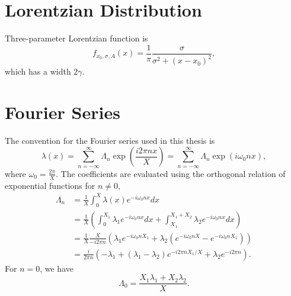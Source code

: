 \section{Lorentzian Distribution}


Three-parameter Lorentzian function is
\begin{equation}
  f_{x_0,\sigma,A}(x)= \frac{1}{\pi} \frac{\sigma}{\sigma^2 + (x-x_0)^2},
\end{equation}
which has a width $2\gamma$.


\section{Fourier Series}

The convention for the Fourier series used in this thesis is
\begin{equation}
\lambda(x) = \sum_{n=-\infty}^{\infty} \Lambda_n \exp\left( \frac{i2\pi n x}{X} \right) = \sum_{n=-\infty}^{\infty} \Lambda_n \exp\left( i \omega_0 n x \right),
\end{equation}
where $\omega_0 = \frac{2\pi}{X}$. The coefficients are evaluated using the orthogonal relation of exponential functions for $n\neq 0$,
\begin{align}
   \Lambda_n &= \frac{1}{X} \int_0^X \lambda(x) e^{ - i \omega_0 n x} dx \\
   & = \frac{1}{X} \left( \int_{0}^{X_1} \lambda_1 e^{ - i \omega_0 n x} dx + \int_{X_1}^{X_1+X_2} \lambda_2 e^{ - i \omega_0 n x} dx  \right) \\
   & = \frac{1}{X} \frac{X}{-i2\pi n} \left( \lambda_1 e^{-i\omega_0 n X_1} + \lambda_2 \left( e^{-i\omega_0 n X} - e^{-i\omega_0 n X_1}  \right) \right) \\
   & = \frac{i}{2\pi n} \left( -\lambda_1 + (\lambda_1 - \lambda_2) e^{-i2\pi n X_1/X} + \lambda_2 e^{-i 2\pi n} \right).
   \label{app-chap:convention-sec:fourier-series-eqn:parametric-resonance-castle-wall-fourier-coeff}
\end{align}
For $n=0$, we have
\begin{equation}
   \Lambda_0 = \frac{X_1 \lambda_1 + X_2 \lambda_2}{X}.
\end{equation}




